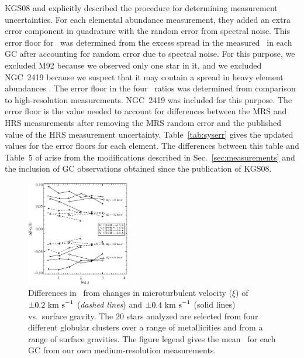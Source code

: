 \documentclass{emulateapj}
\begin{document}
KGS08 and \citeauthor*{kir09} explicitly described the procedure for
determining measurement uncertainties.  For each elemental abundance
measurement, they added an extra error component in quadrature with
the random error from spectral noise.  This error floor for \feh\ was
determined from the excess spread in the measured \feh\ in each GC
after accounting for random error due to spectral noise.  For this
purpose, we excluded M92 because we observed only one star in it, and
we excluded NGC~2419 because we suspect that it may contain a spread
in heavy element abundances \citep{cohetal10}.  The error floor in the
four \xfe\ ratios was determined from comparison to high-resolution
measurements.  NGC~2419 was included for this purpose.  The error
floor is the value needed to account for differences between the MRS
and HRS measurements after removing the MRS random error and the
published value of the HRS measurement uncertainty.
Table~\ref{tab:syserr} gives the updated values for the error floors
for each element.  The differences between this table and Table~5 of
\citeauthor*{kir09} arise from the modifications described in
Sec.~\ref{sec:measurements} and the inclusion of GC observations
obtained since the publication of KGS08.

\begin{figure}[t!]
\centering
\includegraphics[width=0.4\textwidth]{vt_fehdiff.eps}
\caption{Differences in \feh\ from changes in microturbulent velocity
  ($\xi$) of $\pm 0.2~\rm{km~s}^{-1}$ ({\it dashed lines}) and $\pm
  0.4~\rm{km~s}^{-1}$ (solid lines) vs.\ surface gravity.  The 20
  stars analyzed are selected from four different globular clusters
  over a range of metallicities and from a range of surface gravities.
  The figure legend gives the mean \feh\ for each GC from our own
  medium-resolution measurements.\label{fig:vttest}}
\end{figure}
\end{document}
